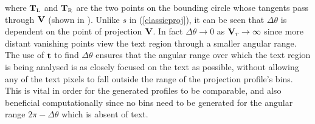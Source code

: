 { \parindent 0mm 
where $\myvec{T}_{\mbox{\tiny L}}$ and $\myvec{T}_{\mbox{\tiny R}}$ are the two
points on the bounding circle whose tangents pass through ${ \bf V }$
(shown
in ).  Unlike $s$ in (\ref{classicproj}), it can be seen that
$\Delta \theta$ is dependent on the point of projection ${ \bf V }$.  In fact
$\Delta \theta \rightarrow 0$ as ${ \bf V }_r \rightarrow \infty$ since more
distant vanishing points view the text region through a smaller angular range.
The use of ${ \bf t }$ to find $\Delta\theta$ ensures that the angular range
over which the text region is being analysed is as closely focused on the text
as possible, without allowing any of the text pixels to fall outside the range
of the projection profile's bins.  This is vital in order for the generated
profiles to be comparable, and also beneficial computationally since no bins
need to be generated for the angular range $2 {\pi}-\Delta \theta$ which is
absent of text.
}

\begin{comment}
Relative to a vanishing point $\myvec{V}$, the text region under examination
will fall entirely within a range of angles, forming an arc or wedge shape
extending from $\myvec{V}$.  The two angles which form this enclosing wedge are
used as the left and right bounds of the projection profile.  Hence all pixels
in the text region will map correctly to a bin in the projection profile, whilst
ensuring that the text fully spans the projection and a useful profile is
obtained.  Without this resizing of the window over which to collect the
projection profile for each vanishing point, the profiles obtained will not
relate to each other.  This is because more distant vanishing points find the
text lying within a smaller angular range, which will produce a drastically
different projection unless we focus on the relevant range.
\end{comment}




